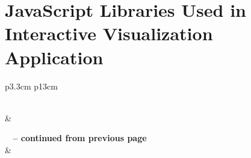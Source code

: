 
\chapter{JavaScript Libraries Used in Interactive Visualization Application}
\label{appendix:javascript_dependencies}

\begin{center}
\begin{longtable}{p{3.3cm} p{13cm}}
\caption[JavaScript dependencies]{JavaScript libraries} \label{tab:javascript_dependencies} \\

\hline {} &  \\ \hline 
\endfirsthead

%
{{\bfseries \tablename\ \thetable{} -- continued from previous page}} \\
\hline {} &  \\ \hline 
\endhead

\hline {} \\ \hline
\endfoot

\hline \hline
\endlastfoot


\end{longtable}
\end{center}
